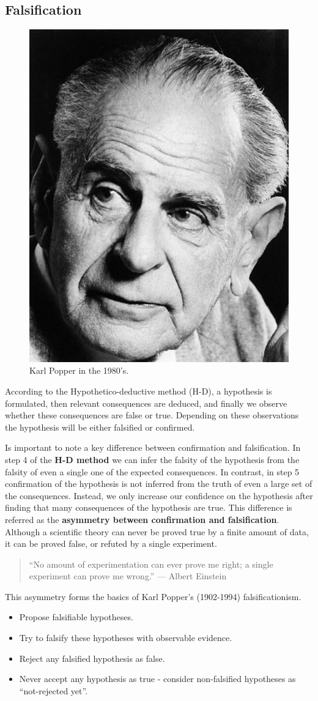\documentclass[
]{book}
\providecommand{\tightlist}{%
  \setlength{\itemsep}{0pt}\setlength{\parskip}{0pt}}
\begin{document}
\hypertarget{falsification}{%
\subsection{Falsification}\label{falsification}}

\begin{figure}  
 \begin{center}
    \includegraphics[width=.22\textwidth]{Figures/Karl_Popper.jpg}  
  \captionsetup{labelformat=empty}
  \caption{Karl Popper in the 1980's.} 
\end{center}
\end{figure}
\addtocounter{figure}{-1}

According to the Hypothetico-deductive method (H-D), a hypothesis is formulated, then relevant consequences are deduced, and finally we observe whether these consequences are false or true. Depending on these observations the hypothesis will be either falsified or confirmed.

Is important to note a key difference between confirmation and falsification. In step 4 of the \textbf{H-D method} we can infer the falsity of the hypothesis from the falsity of even a single one of the expected consequences. In contrast, in step 5 confirmation of the hypothesis is not inferred from the truth of even a large set of the consequences. Instead, we only increase our confidence on the hypothesis after finding that many consequences of the hypothesis are true. This difference is referred as the \textbf{asymmetry between confirmation and falsification}. Although a scientific theory can never be proved true by a finite amount of data, it can be proved false, or refuted by a single experiment.

\begin{quote}
``No amount of experimentation can ever prove me right; a single experiment can prove me wrong.'' --- Albert Einstein
\end{quote}

This asymmetry forms the basics of Karl Popper's (1902-1994) falsificationism.

\begin{itemize}
\tightlist
\item
  Propose falsifiable hypotheses.
\item
  Try to falsify these hypotheses with observable evidence.
\item
  Reject any falsified hypothesis as false.
\item
  Never accept any hypothesis as true - consider non-falsified hypotheses as ``not-rejected yet''.
\end{itemize}
\end{document}
